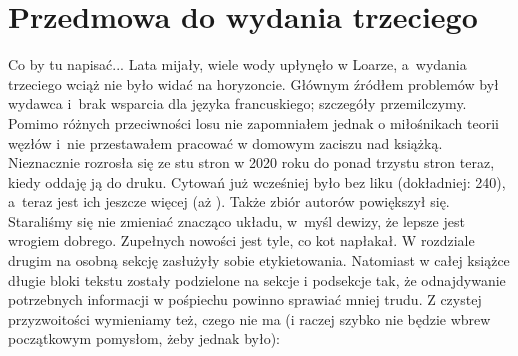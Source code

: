 \section*{Przedmowa do wydania trzeciego}
Co by tu napisać...
Lata mijały, wiele wody upłynęło w Loarze, a~wydania trzeciego wciąż nie było widać na horyzoncie.
Głównym źródłem problemów był wydawca i~brak wsparcia dla języka francuskiego; szczegóły przemilczymy.
Pomimo różnych przeciwności losu nie zapomniałem jednak o miłośnikach teorii węzłów i~nie przestawałem pracować w domowym zaciszu nad książką.
Nieznacznie rozrosła się ze stu stron w 2020 roku do ponad trzystu stron teraz, kiedy oddaję ją do druku.
Cytowań już wcześniej było bez liku (dokładniej: 240), a~teraz jest ich jeszcze więcej (aż \citationcount).
Także zbiór autorów powiększył się.
Staraliśmy się nie zmieniać znacząco układu, w~myśl dewizy, że lepsze jest wrogiem dobrego.
Zupełnych nowości jest tyle, co kot napłakał.
W rozdziale drugim na osobną sekcję zasłużyły sobie etykietowania.
Natomiast w całej książce długie bloki tekstu zostały podzielone na sekcje i podsekcje tak, że odnajdywanie potrzebnych informacji w pośpiechu powinno sprawiać mniej trudu.
Z czystej przyzwoitości wymieniamy też, czego nie ma (i raczej szybko nie będzie wbrew początkowym pomysłom, żeby jednak było):
